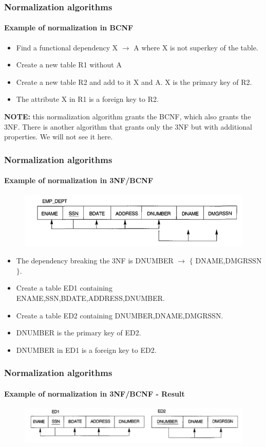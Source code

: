 \documentclass{beamer}
\newcommand{\valseq}[1]{$\lbrace$ #1 $\rbrace$}
\newcommand{\fdep}[2]{#1 $\rightarrow$ #2}
\begin{document}
\begin{frame}
	\frametitle{Normalization algorithms}
	\framesubtitle{Example of normalization in BCNF}
	
	\begin{itemize}
		\item Find a functional dependency \fdep{X}{A} where X is not superkey of the table.
		\item Create a new table R1 without A
		\item Create a new table R2 and add to it X and A. X is the primary key of R2.
		\item The attribute X in R1 is a foreign key to R2.
	\end{itemize}
	
	\textbf{NOTE:} this normalization algorithm grants the BCNF, which also grants the 3NF. There is another algorithm that grants only the 3NF but with additional properties. We will not see it here.
\end{frame}

\begin{frame}
	\frametitle{Normalization algorithms}
	\framesubtitle{Example of normalization in 3NF/BCNF}
	
	\begin{figure}
		\includegraphics[scale=0.5]{img/normalization/norm17}
	\end{figure}
	
	\begin{itemize}
		\item The dependency breaking the 3NF is \fdep{DNUMBER}{\valseq{DNAME,DMGRSSN}}.
		\item Create a table ED1 containing ENAME,SSN,BDATE,ADDRESS,DNUMBER.
		\item Create a table ED2 containing DNUMBER,DNAME,DMGRSSN.
		\item DNUMBER is the primary key of ED2.
		\item DNUMBER in ED1 is a foreign key to ED2. 
		
	\end{itemize}
\end{frame}

\begin{frame}
	\frametitle{Normalization algorithms}
	\framesubtitle{Example of normalization in 3NF/BCNF - Result}
	
	\begin{figure}
		\includegraphics[scale=0.4]{img/normalization/norm18}
	\end{figure}
\end{frame}
\end{document}
